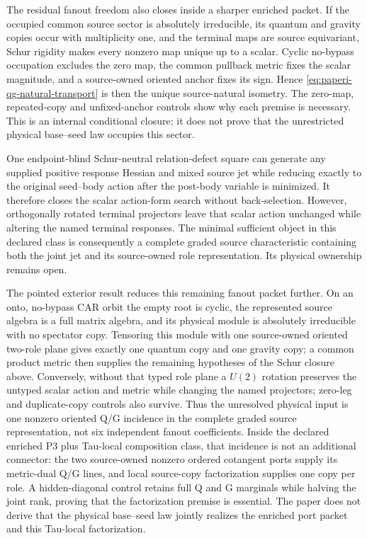 \documentclass[11pt]{article}
\begin{document}
The residual fanout freedom also closes inside a sharper enriched packet.
If the occupied common source sector is absolutely irreducible, its quantum
and gravity copies occur with multiplicity one, and the terminal maps are
source equivariant, Schur rigidity makes every nonzero map unique up to a
scalar.  Cyclic no-bypass occupation excludes the zero map, the common
pullback metric fixes the scalar magnitude, and a source-owned oriented anchor
fixes its sign.  Hence \eqref{eq:paperi-qg-natural-transport} is then the unique
source-natural isometry.  The zero-map, repeated-copy and unfixed-anchor
controls show why each premise is necessary.  This is an internal conditional
closure; it does not prove that the unrestricted physical base--seed law
occupies this sector.

One endpoint-blind Schur-neutral relation-defect square can generate any
supplied positive response Hessian and mixed source jet while reducing exactly
to the original seed--body action after the post-body variable is minimized.
It therefore closes the scalar action-form search without back-selection.
However, orthogonally rotated terminal projectors leave that scalar action
unchanged while altering the named terminal responses.  The minimal sufficient
object in this declared class is consequently a complete graded source
characteristic containing both the joint jet and its source-owned role
representation.  Its physical ownership remains open.

The pointed exterior result reduces this remaining fanout packet further.
On an onto, no-bypass CAR orbit the empty root is cyclic, the represented
source algebra is a full matrix algebra, and its physical module is absolutely
irreducible with no spectator copy.  Tensoring this module with one
source-owned oriented two-role plane gives exactly one quantum copy and one
gravity copy; a common product metric then supplies the remaining hypotheses
of the Schur closure above.  Conversely, without that typed role plane a
$U(2)$ rotation preserves the untyped scalar action and metric while changing
the named projectors; zero-leg and duplicate-copy controls also survive.
Thus the unresolved physical input is one nonzero oriented Q/G incidence in
the complete graded source representation, not six independent fanout
coefficients.  Inside the declared enriched P3 plus Tau-local composition
class, that incidence is not an additional connector: the two source-owned
nonzero ordered cotangent ports supply its metric-dual Q/G lines, and local
source-copy factorization supplies one copy per role.  A hidden-diagonal
control retains full Q and G marginals while halving the joint rank, proving
that the factorization premise is essential.  The paper does not derive that
the physical base--seed law jointly realizes the enriched port packet and
this Tau-local factorization.
\end{document}
